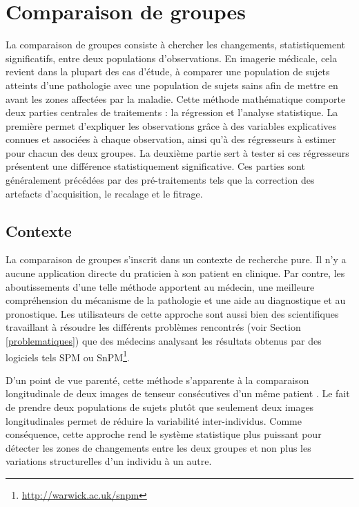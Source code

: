 
\chapter{Comparaison de groupes}
\label{Chapter3}

La comparaison de groupes consiste à chercher les changements, statistiquement significatifs, entre deux populations d'observations. 
En imagerie médicale, cela revient dans la plupart des cas d'étude, à comparer une population de sujets atteints d'une pathologie avec une population de sujets sains afin de mettre en avant les zones affectées par la maladie.
Cette méthode mathématique comporte deux parties centrales de traitements : la régression et l'analyse statistique. 
La première permet d'expliquer les observations grâce à des variables explicatives connues et associées à chaque observation, ainsi qu'à des régresseurs à estimer pour chacun des deux groupes.
La deuxième partie sert à tester si ces régresseurs présentent une différence statistiquement significative.
Ces parties sont généralement précédées par des pré-traitements tels que la correction des artefacts d'acquisition, le recalage et le fitrage.\\



\section{Contexte}
La comparaison de groupes s'inscrit dans un contexte de recherche pure. 
Il n'y a aucune application directe du praticien à son patient en clinique.
Par contre, les aboutissements d'une telle méthode apportent au médecin, une meilleure compréhension du mécanisme de la pathologie et une aide au diagnostique et au pronostique.
Les utilisateurs de cette approche sont aussi bien des scientifiques travaillant à résoudre les différents problèmes rencontrés (voir Section \ref{problematiques}) que des médecins analysant les résultats obtenus par des logiciels tels SPM ou SnPM\footnote{\url{http://warwick.ac.uk/snpm}}.

D'un point de vue parenté, cette méthode s'apparente à la comparaison longitudinale de deux images de tenseur consécutives d'un même patient \cite{Grigis2012}.
Le fait de prendre deux populations de sujets plutôt que seulement deux images longitudinales permet de réduire la variabilité inter-individus. 
Comme conséquence, cette approche rend le système statistique plus puissant pour détecter les zones de changements entre les deux groupes et non plus les variations structurelles d'un individu à un autre.

